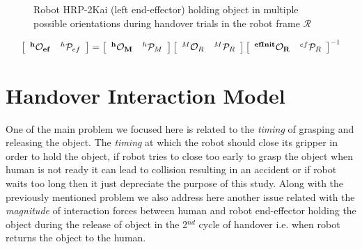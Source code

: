 \documentclass[a4paper, 12pt, oneside]{Thesis}  %
\begin{document}
\begin{figure}[ht]
	\caption{Robot HRP-2Kai (left end-effector) holding object in multiple possible orientations during handover trials in the robot frame $\mathcal{R}$}
	\label{fig:robot_lt_orientations}
\end{figure} 


\begin{gather}\label{X_efinit_hori}
\left[\begin{array}{cc}
\bf{{}^{h}\mathcal{O}_{ef}} & {}^{h}\mathcal{P}_{ef}
\end{array}\right] =
\left[\begin{array}{cc}
\bf{{}^{h}\mathcal{O}_M} & {}^{h}\mathcal{P}_M
\end{array}\right]
\left[\begin{array}{cc}
{}^{M}\mathcal{O}_R & {}^{M}\mathcal{P}_R
\end{array}\right]
\left[\begin{array}{cc}
\bf{{}^{efInit}\mathcal{O}_{R}} & {}^{ef}\mathcal{P}_{R}
\end{array}\right]^{-1}
\end{gather}



\clearpage

\section{Handover Interaction Model}\label{interaction model}

One of the main problem we focused here is related to the \textit{timing} of grasping and releasing the object. The \textit{timing} at which the robot should close its gripper in order to hold the object, if robot tries to close too early to grasp the object when human is not ready it can lead to collision resulting in an accident or if robot waits too long then it just depreciate the purpose of this study. Along with the previously mentioned problem we also address here another issue related with the \textit{magnitude} of interaction forces between human and robot end-effector holding the object during the release of object in the 2$^{nd}$ cycle of handover i.e. when robot returns the object to the human.
\end{document}
